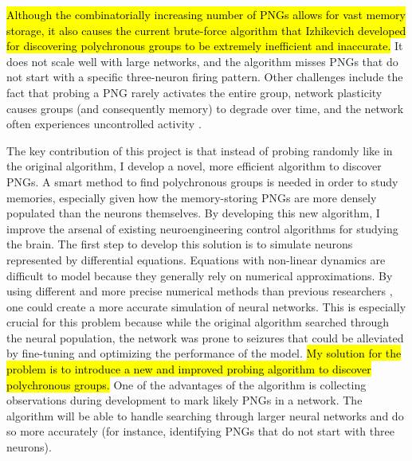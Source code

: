 \documentclass{sigchi}
\begin{document}
\hl{Although the combinatorially increasing number of PNGs allows for vast memory storage, it also causes the current brute-force algorithm that Izhikevich developed for discovering polychronous groups to be extremely inefficient and inaccurate.} It does not scale well with large networks, and the algorithm misses PNGs that do not start with a specific three-neuron firing pattern. Other challenges include the fact that probing a PNG rarely activates the entire group, network plasticity causes groups (and consequently memory) to degrade over time, and the network often experiences uncontrolled activity \cite{pngalgo}. 

The key contribution of this project is that instead of probing randomly like in the original algorithm, I develop a novel, more efficient algorithm to discover PNGs. A smart method to find polychronous groups is needed in order to study memories, especially given how the memory-storing PNGs are more densely populated than the neurons themselves. By developing this new algorithm, I improve the arsenal of existing neuroengineering control algorithms for studying the brain. The first step to develop this solution is to simulate neurons represented by differential equations. Equations with non-linear dynamics are difficult to model because they generally rely on numerical approximations. By using different and more precise numerical methods than previous researchers \cite{simtools}, one could create a more accurate simulation of neural networks. This is especially crucial for this problem because while the original algorithm searched through the neural population, the network was prone to seizures that could be alleviated by fine-tuning and optimizing the performance of the model. \hl{My solution for the problem is to introduce a new and improved probing algorithm to discover polychronous groups.} One of the advantages of the algorithm is collecting observations during development to mark likely PNGs in a network. The algorithm will be able to handle searching through larger neural networks and do so more accurately (for instance, identifying PNGs that do not start with three neurons).
\end{document}
